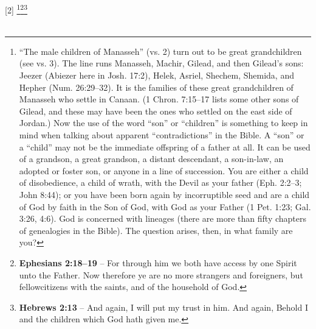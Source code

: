 [2] \footnote{“The male children of Manasseh” (vs. 2)
turn out to be great grandchildren (see vs. 3).
The line runs Manasseh, Machir, Gilead, and
then Gilead’s sons: Jeezer (Abiezer here in
Josh. 17:2), Helek, Asriel, Shechem, Shemida,
and Hepher (Num. 26:29–32). It is the families
of these great grandchildren of Manasseh who
settle in Canaan. (1 Chron. 7:15–17 lists some
other sons of Gilead, and these may have been
the ones who settled on the east side of Jordan.)
Now the use of the word “son” or
“children” is something to keep in mind when
talking about apparent “contradictions” in the
Bible. A “son” or a “child” may not be the
immediate offspring of a father at all. It can be
used of a grandson, a great grandson, a distant
descendant, a son-in-law, an adopted or foster
son, or anyone in a line of succession. You are either a child of disobedience,
a child of wrath, with the Devil as your father
(Eph. 2:2–3; John 8:44); or you have been born
again by incorruptible seed and are a child of
God by faith in the Son of God, with God as
your Father (1 Pet. 1:23; Gal. 3:26, 4:6). God
is concerned with lineages (there are more than
fifty chapters of genealogies in the Bible). The
question arises, then, in what family are you?}\footnote{\textbf{Ephesians 2:18--19} -- For through him we both have access
by one Spirit unto the Father. Now therefore
ye are no more strangers and foreigners, but
fellowcitizens with the saints, and of the
household of God.}\footnote{\textbf{Hebrews 2:13} -- And again, I will put my trust in him.
And again, Behold I and the children which
God hath given me.}\\
\\
